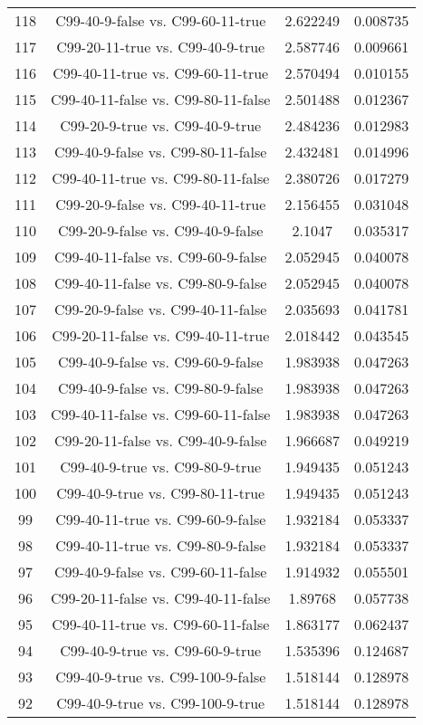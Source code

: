 \documentclass[a4paper,10pt]{article}
\begin{document}
\begin{landscape}
\begin{table}[!htp]
\begin{tabular}{cccc}
118&C99-40-9-false vs. C99-60-11-true&2.622249&0.008735\\
117&C99-20-11-true vs. C99-40-9-true&2.587746&0.009661\\
116&C99-40-11-true vs. C99-60-11-true&2.570494&0.010155\\
115&C99-40-11-false vs. C99-80-11-false&2.501488&0.012367\\
114&C99-20-9-true vs. C99-40-9-true&2.484236&0.012983\\
113&C99-40-9-false vs. C99-80-11-false&2.432481&0.014996\\
112&C99-40-11-true vs. C99-80-11-false&2.380726&0.017279\\
111&C99-20-9-false vs. C99-40-11-true&2.156455&0.031048\\
110&C99-20-9-false vs. C99-40-9-false&2.1047&0.035317\\
109&C99-40-11-false vs. C99-60-9-false&2.052945&0.040078\\
108&C99-40-11-false vs. C99-80-9-false&2.052945&0.040078\\
107&C99-20-9-false vs. C99-40-11-false&2.035693&0.041781\\
106&C99-20-11-false vs. C99-40-11-true&2.018442&0.043545\\
105&C99-40-9-false vs. C99-60-9-false&1.983938&0.047263\\
104&C99-40-9-false vs. C99-80-9-false&1.983938&0.047263\\
103&C99-40-11-false vs. C99-60-11-false&1.983938&0.047263\\
102&C99-20-11-false vs. C99-40-9-false&1.966687&0.049219\\
101&C99-40-9-true vs. C99-80-9-true&1.949435&0.051243\\
100&C99-40-9-true vs. C99-80-11-true&1.949435&0.051243\\
99&C99-40-11-true vs. C99-60-9-false&1.932184&0.053337\\
98&C99-40-11-true vs. C99-80-9-false&1.932184&0.053337\\
97&C99-40-9-false vs. C99-60-11-false&1.914932&0.055501\\
96&C99-20-11-false vs. C99-40-11-false&1.89768&0.057738\\
95&C99-40-11-true vs. C99-60-11-false&1.863177&0.062437\\
94&C99-40-9-true vs. C99-60-9-true&1.535396&0.124687\\
93&C99-40-9-true vs. C99-100-9-false&1.518144&0.128978\\
92&C99-40-9-true vs. C99-100-9-true&1.518144&0.128978\\

\end{tabular}
\end{table}
\end{landscape}
\end{document}
